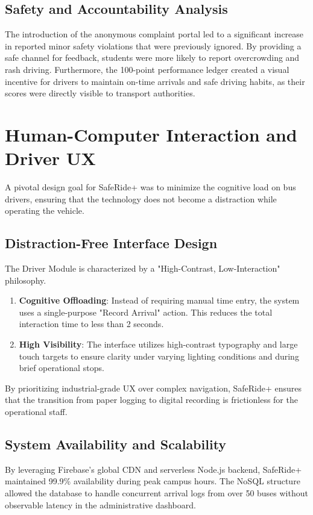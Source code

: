\documentclass[conference]{IEEEtran}
\begin{document}
\subsection{Safety and Accountability Analysis}
The introduction of the anonymous complaint portal led to a significant increase in reported minor safety violations that were previously ignored. By providing a safe channel for feedback, students were more likely to report overcrowding and rash driving. Furthermore, the 100-point performance ledger created a visual incentive for drivers to maintain on-time arrivals and safe driving habits, as their scores were directly visible to transport authorities.

\section{Human-Computer Interaction and Driver UX}
A pivotal design goal for SafeRide+ was to minimize the cognitive load on bus drivers, ensuring that the technology does not become a distraction while operating the vehicle. 

\subsection{Distraction-Free Interface Design}
The Driver Module is characterized by a "High-Contrast, Low-Interaction" philosophy.
\begin{enumerate}
    \item \textbf{Cognitive Offloading}: Instead of requiring manual time entry, the system uses a single-purpose "Record Arrival" action. This reduces the total interaction time to less than 2 seconds.
    \item \textbf{High Visibility}: The interface utilizes high-contrast typography and large touch targets to ensure clarity under varying lighting conditions and during brief operational stops.
\end{enumerate}
By prioritizing industrial-grade UX over complex navigation, SafeRide+ ensures that the transition from paper logging to digital recording is frictionless for the operational staff.

\subsection{System Availability and Scalability}
By leveraging Firebase's global CDN and serverless Node.js backend, SafeRide+ maintained 99.9\% availability during peak campus hours. The NoSQL structure allowed the database to handle concurrent arrival logs from over 50 buses without observable latency in the administrative dashboard.
\end{document}
